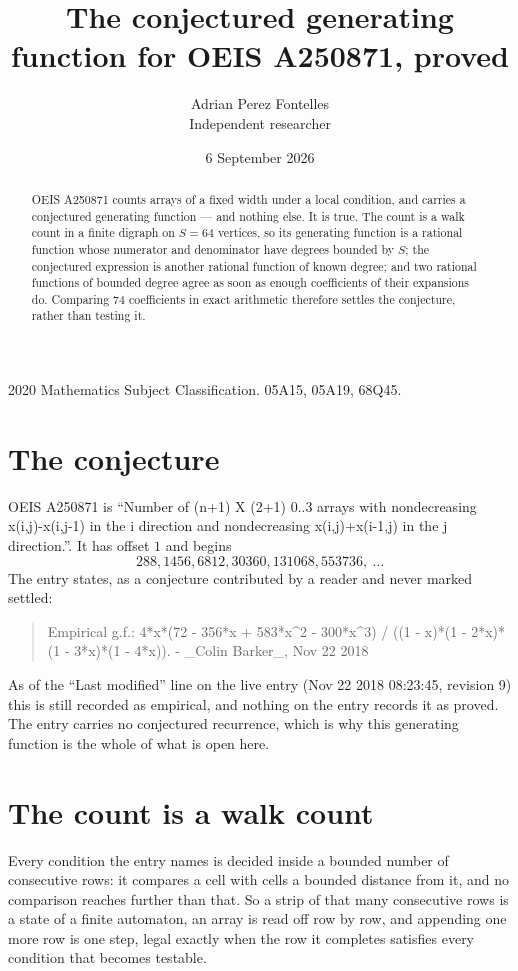\documentclass[11pt,a4paper]{article}
\title{The conjectured generating function for OEIS A250871, proved}
\author{Adrian Perez Fontelles\\ \small Independent researcher}
\date{6 September 2026}
\theoremstyle{plain}
\theoremstyle{definition}
\begin{document}
\maketitle

\begin{abstract}
OEIS A250871 counts arrays of a fixed width under a local condition, and carries a conjectured
generating function --- and nothing else. It is true. The count is a walk count in a finite
digraph on $S=64$ vertices, so its generating function is a rational function whose numerator
and denominator have degrees bounded by $S$; the conjectured expression is another rational
function of known degree; and two rational functions of bounded degree agree as soon as enough
coefficients of their expansions do. Comparing $74$ coefficients in exact arithmetic
therefore settles the conjecture, rather than testing it.
\end{abstract}

\noindent\small 2020 Mathematics Subject Classification. 05A15, 05A19, 68Q45.\normalsize

\section{The conjecture}

OEIS A250871 is ``Number of (n+1) X (2+1) 0..3 arrays with nondecreasing x(i,j)-x(i,j-1) in the i direction and nondecreasing x(i,j)+x(i-1,j) in the j direction.''. It has offset $1$ and begins
\[
288, 1456, 6812, 30360, 131068, 553736,\ \dots
\]
The entry states, as a conjecture contributed by a reader and never marked settled:
\begin{quote}
Empirical g.f.: 4*x*(72 - 356*x + 583*x\^{}2 - 300*x\^{}3) / ((1 - x)*(1 - 2*x)*(1 - 3*x)*(1 - 4*x)). - \_Colin Barker\_, Nov 22 2018
\end{quote}
As of the ``Last modified'' line on the live entry (Nov 22 2018 08:23:45, revision 9) this is still
recorded as empirical, and nothing on the entry records it as proved. The entry carries no
conjectured recurrence, which is why this generating function is the whole of what is open
here.

\section{The count is a walk count}

Every condition the entry names is decided inside a bounded number of consecutive rows: it
compares a cell with cells a bounded distance from it, and no comparison reaches further than
that. So a strip of that many consecutive rows is a state of a finite automaton, an array is
read off row by row, and appending one more row is one step, legal exactly when the row it
completes satisfies every condition that becomes testable.
\end{document}
